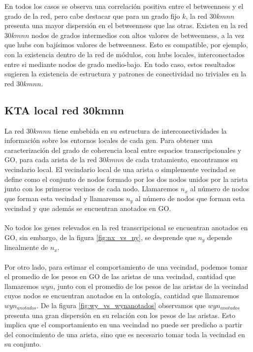 En todos los casos se observa una correlación positiva entre el betweenness y el grado de la red, pero cabe destacar que para un grado fijo $k$, la red $30kmnn$ presenta una mayor dispersión en el betweenness que las otras. Existen en la red $30kmnn$ nodos de grados intermedios con altos valores de betweenness, a la vez que hubs con bajísimos valores de betweenness. Esto es compatible, por ejemplo, con la existencia dentro de la red de módulos, con hubs locales, interconectados entre si mediante nodos de grado medio-bajo. En todo caso, estos resultados sugieren la existencia de estructura y patrones de conectividad no triviales en la red $30kmnn$.
\clearpage
\subsection{KTA local red 30kmnn}
La red $30kmnn$ tiene embebida en su estructura de interconectividades la información sobre los entornos locales de cada gen. Para obtener una caracterización del grado de coherencia local entre espacios transcripcionales y GO, para cada arista de la red $30kmnn$ de cada tratamiento, encontramos su vecindario local. El vecindario local de una arista o simplemente vecindad se define como el conjunto de nodos formado por los dos nodos unidos por la arista junto con los primeros vecinos de cada nodo. Llamaremos $n_x$ al número de nodos que forman esta vecindad y llamaremos $n_y$ al número de nodos que forman esta vecindad y que además se encuentran anotados en GO.\\\\
No todos los genes relevados en la red transcripcional se encuentran anotados en GO, sin embargo, de la figura \ref{fig:nx_vs_ny}, se desprende que $n_y$ depende linealmente de $n_x$.\\\\
Por otro lado, para estimar el comportamiento de una vecindad, podemos tomar el promedio de los pesos en GO de las aristas de una vecindad, cantidad que llamaremos $wyn$, junto con el promedio de los pesos de las aristas de la vecindad cuyos nodos se encuentran anotados en la ontología, cantidad que llamaremos $wyn_{anotados}$. De la figura \ref{fig:wy_vs_wynanotados} observamos que $wyn_{anotados}$ presenta una gran dispersión en su relación con los pesos de las aristas. Esto implica que el comportamiento en una vecindad no puede ser predicho a partir del conocimiento de una arista, sino que es necesario tomar toda la vecindad en su conjunto.\\
